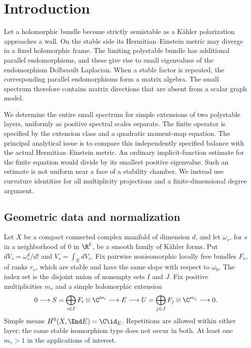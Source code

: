 \section{Introduction}\label{sec:introduction}

Let a holomorphic bundle become strictly semistable as a Kähler polarization
approaches a wall. On the stable side its Hermitian--Einstein metric may
diverge in a fixed holomorphic frame. The limiting polystable bundle has
additional parallel endomorphisms, and these give rise to small eigenvalues
of the endomorphism Dolbeault Laplacian. When a stable factor is repeated,
the corresponding parallel endomorphisms form a matrix algebra. The small
spectrum therefore contains matrix directions that are absent from a
scalar graph model.

We determine the entire small spectrum for simple extensions of two
polystable layers, uniformly as positive spectral scales separate. The
finite operator is specified by the extension class and a quadratic
moment-map equation. The principal analytical issue is to compare this
independently specified balance with the actual Hermitian--Einstein metric.
An ordinary implicit-function estimate for the finite equation would divide
by its smallest positive eigenvalue. Such an estimate is not uniform near
a face of a stability chamber. We instead use curvature identities for
all multiplicity projections and a finite-dimensional degree argument.

\subsection{Geometric data and normalization}
Let $X$ be a compact connected complex manifold of dimension $d$, and let
$\omega_s$, for $s$ in a neighborhood of $0$ in $\R^k$, be a smooth family
of Kähler forms. Put $dV_s=\omega_s^d/d!$ and $V_s=\int_XdV_s$.
Fix pairwise nonisomorphic locally free bundles $F_v$, of ranks $r_v$,
which are stable and have the same slope with respect to $\omega_0$.
The index set is the disjoint union of nonempty sets $I$ and $J$.
Fix positive multiplicities $m_v$ and a simple holomorphic extension
\begin{equation}\label{eq:extension}
0\longrightarrow S=\bigoplus_{i\in I}F_i\otimes\C^{m_i}
\longrightarrow E\longrightarrow
U=\bigoplus_{j\in J}F_j\otimes\C^{m_j}\longrightarrow0.
\end{equation}
Simple means $H^0(X,\End E)=\C\id_E$. Repetitions are allowed within
either layer; the same stable isomorphism type does not occur in both.
At least one $m_v>1$ in the applications of interest.

